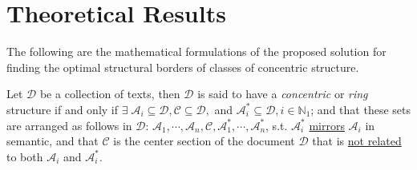 \chapter{Theoretical Results}
\label{appendix:theoretical_results}
\setcounter{section}{1}
The following are the mathematical formulations of the proposed solution for finding the optimal structural borders of classes of concentric structure.
\begin{defn}[\it Concentric]\label{defn:concentric}
    Let $\mathscr{D}$ be a collection of texts, then $\mathscr{D}$ is said to have a \textit{concentric} or \textit{ring} structure if and only if $\exists\;\mathscr{A}_i\subseteq\mathscr{D},\mathscr{C}\subseteq\mathscr{D},$ and $\mathscr{A}_i^{*}\subseteq\mathscr{D},i\in\mathbb{N}_1$; and that these sets are arranged as follows in $\mathscr{D}$:  $\mathscr{A}_1,\cdots,\mathscr{A}_n,\mathscr{C},\mathscr{A}_1^{*},\cdots,\mathscr{A}_n^{*}$, s.t. $\mathscr{A}_i^{*}$ \underline{mirrors} $\mathscr{A}_i$ in semantic, and that $\mathscr{C}$ is the center section of the document $\mathscr{D}$ that is \underline{not related} to both $\mathscr{A}_i$ and $\mathscr{A}_i^{*}$.
\end{defn}

